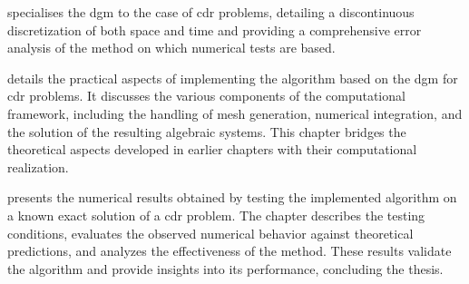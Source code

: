  specialises the \acrshort{dgm} to the case of \acrfull{cdr} problems, detailing a discontinuous discretization of both space and time and providing a comprehensive error analysis of the method on which numerical tests are based.

 details the practical aspects of implementing the algorithm based on the \acrshort{dgm} for \acrshort{cdr} problems. It discusses the various components of the computational framework, including the handling of mesh generation, numerical integration, and the solution of the resulting algebraic systems. This chapter bridges the theoretical aspects developed in earlier chapters with their computational realization.

 presents the numerical results obtained by testing the implemented algorithm on a known exact solution of a \acrshort{cdr} problem. The chapter describes the testing conditions, evaluates the observed numerical behavior against theoretical predictions, and analyzes the effectiveness of the method. These results validate the algorithm and provide insights into its performance, concluding the thesis.